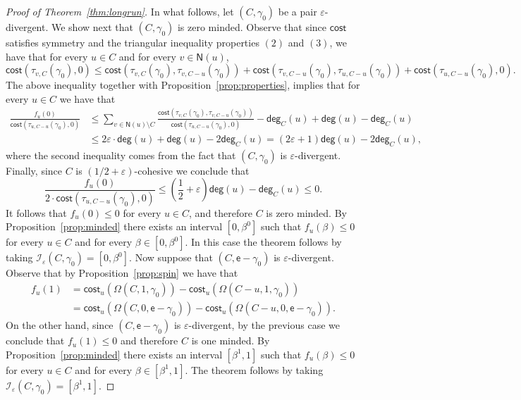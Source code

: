 \documentclass[letterpaper,11pt]{article}
\newcommand{\nsf}{\mathsf{N}}
\newcommand{\cost}{\mathsf{cost}}
\newcommand{\degsf}{\mathsf{deg}}
\newcommand{\vvcom}[1]{\todo[color=red!25!white]{Victor: #1}}
\begin{document}
\begin{proof}[Proof of Theorem~\ref{thm:longrun}]
\vvcom{arreglar esto}
In what follows, let $(C,\gamma_0)$ be a pair $\varepsilon$-divergent.
We show next that $(C,\gamma_0)$ is zero minded.
Observe that since $\cost$ satisfies symmetry and the triangular inequality properties $(2)$ and $(3)$, we have that for every $u\in C$ and for every $v\in \nsf(u)$,
\begin{equation*}
\cost(\tau_{v,C}(\gamma_0),0)\le \cost(\tau_{v,C}(\gamma_0),\tau_{v,C-u}(\gamma_0))+\cost(\tau_{v,C-u}(\gamma_0),\tau_{u,C-u}(\gamma_0))+\cost(\tau_{u,C-u}(\gamma_0),0).
\end{equation*}
The above inequality together with Proposition~\ref{prop:properties}, implies that for every $u\in C$ we have that
\begin{align*}
\frac{f_u(0)}{\cost(\tau_{u,C-u}(\gamma_0),0)}&\le \sum_{v\in \nsf(u)\setminus C}\frac{ \cost(\tau_{v,C}(\gamma_0),\tau_{v,C-u}(\gamma_0))}{\cost(\tau_{u,C-u}(\gamma_0),0)}-\degsf_C(u)+\degsf(u)-\degsf_C(u)\\
&\le 2\varepsilon\cdot \degsf(u)+\degsf(u)-2\degsf_C(u)=(2\varepsilon+1)\degsf(u)-2\degsf_C(u),
\end{align*}
where the second inequality comes from the fact that $(C,\gamma_0)$ is $\varepsilon$-divergent.
Finally, since $C$ is $(1/2+\varepsilon)$-cohesive we conclude that 
\begin{equation*}
\frac{f_u(0)}{2\cdot \cost(\tau_{u,C-u}(\gamma_0),0)}\le \left(\frac{1}{2}+\varepsilon\right)\degsf(u)-\degsf_C(u)\le 0.
\end{equation*}
It follows that $f_u(0)\le 0$ for every $u\in C$, and therefore $C$ is zero minded. 
By Proposition~\ref{prop:minded} there exists an interval $[0,\beta^0]$ such that $f_u(\beta)\le 0$ for every $u\in C$ and for every $\beta\in [0,\beta^0]$. 
In this case the theorem follows by taking $\mathcal{I}_{\varepsilon}(C,\gamma_0)=[0,\beta^0]$.
Now suppose that $(C,\mathsf{e}-\gamma_0)$ is $\varepsilon$-divergent. 
Observe that by Proposition~\ref{prop:spin} we have that 
\begin{align*}
f_u(1)&=\cost_u(\Omega(C,1,\gamma_0))-\cost_u(\Omega(C-u,1,\gamma_0))\\
&=\cost_u(\Omega(C,0,\mathsf{e}-\gamma_0))-\cost_u(\Omega(C-u,0,\mathsf{e}-\gamma_0)).
\end{align*}
On the other hand, since $(C,\mathsf{e}-\gamma_0)$ is $\varepsilon$-divergent, by the previous case we conclude that $f_u(1)\le 0$ and therefore $C$ is one minded. 
By Proposition~\ref{prop:minded} there exists an interval $[\beta^1,1]$ such that $f_u(\beta)\le 0$ for every $u\in C$ and for every $\beta\in [\beta^1,1]$. 
The theorem follows by taking $\mathcal{I}_{\varepsilon}(C,\gamma_0)=[\beta^1,1]$.
\end{proof}
\end{document}
